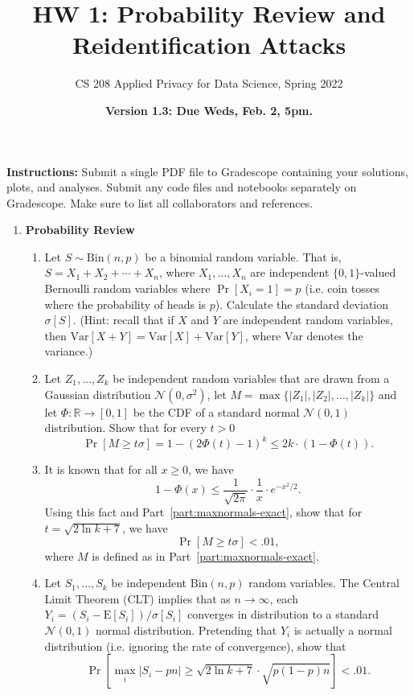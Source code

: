 \documentclass[11pt]{article}
\title{\vspace{-1.5cm} HW 1:  Probability Review and Reidentification Attacks}
\author{CS 208 Applied Privacy for Data Science, Spring 2022}
\date{\textbf{Version 1.3: Due Weds, Feb. 2, 5pm.}}
\newcommand{\Var}{\mathrm{Var}}
\newcommand{\Exp}{\mathrm{E}}
\newcommand{\R}{\mathbb{R}}
\newcommand{\Normal}{\mathcal{N}}
\newcommand{\Bin}{\mathrm{Bin}}
\begin{document}
\maketitle


\vspace{-5ex}

\noindent \textbf{Instructions:} Submit a single PDF file to Gradescope containing your solutions, plots, and analyses. Submit any code files and notebooks separately on Gradescope.  
Make sure to list all collaborators and references.

\begin{enumerate}[leftmargin=*]

\item \textbf{Probability Review}

\begin{enumerate}
    \item  Let $S\sim \Bin(n,p)$ be a binomial random variable.  That is, $S=X_1+X_2+\cdots+X_n$, where 
    $X_1,\ldots,X_n$ are independent $\{0,1\}$-valued Bernoulli random variables where $\Pr[X_i = 1]=p$ (i.e. coin tosses where the probability of heads is $p$).  Calculate the standard deviation $\sigma[S]$.  (Hint: recall that if $X$ and $Y$ are independent random variables, then $\Var[X+Y]=\Var[X]+\Var[Y]$, where $\Var$ denotes the variance.)
    
    \item Let $Z_1,\ldots,Z_k$ be independent random variables that are drawn from a Gaussian distribution $\Normal(0, \sigma^2)$, let $M=\max\{|Z_1|,|Z_2|,\ldots,|Z_k|\}$ and let $\Phi : \R\rightarrow [0,1]$ be the CDF of a standard normal $\Normal(0,1)$ distribution.  Show that for every $t>0$
    $$\Pr[M \geq t\sigma ] = 1- (2\Phi(t)-1)^k \leq 2k\cdot (1-\Phi(t)).$$
    \label{part:maxnormals-exact}
    
    \item It is known that for all $x\geq 0$, we have 
    $$1-\Phi(x) \leq \frac{1}{\sqrt{2\pi}}\cdot \frac{1}{x}\cdot e^{-x^2/2}.$$
    Using this fact and Part~\ref{part:maxnormals-exact}, show that for $t = \sqrt{2\ln k+7}$, we have
    $$\Pr[M \geq t\sigma] < .01,$$
    where $M$ is defined as in Part~\ref{part:maxnormals-exact}.
    
    \item Let $S_1,\ldots,S_k$ be independent $\Bin(n,p)$ random variables.  The Central Limit Theorem (CLT) implies that as $n\rightarrow \infty$, each $Y_i=(S_i-\Exp[S_i])/\sigma[S_i]$ converges in distribution to a standard $\Normal(0,1)$ normal distribution. Pretending that $Y_i$ is actually a normal distribution (i.e. ignoring the rate of convergence), show that
    $$\Pr\left[\max_i |S_i-pn| \geq \sqrt{2\ln k + 7} \cdot\sqrt{p(1-p) n}\right] < .01.$$
    

\end{enumerate}
\end{enumerate}
\end{document}
